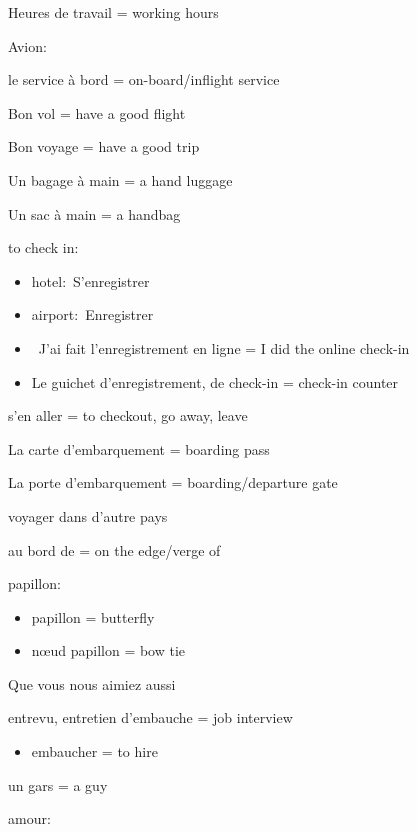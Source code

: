 Heures de travail = working hours~

Avion:

{le service à bord = on-board/inflight service}

Bon vol = have a good flight~

Bon voyage = have a good trip~

Un bagage à main = a hand luggage~

Un sac à main = a handbag~

to check in:

\begin{itemize}
\item
  hotel:~S'enregistrer
\item
  airport:~Enregistrer
\item
  ~J'ai fait l'enregistrement en ligne = I did the online check-in
\item
  Le guichet d'enregistrement, de check-in = check-in counter
\end{itemize}

s'en aller = to checkout, go away, leave

La carte d'embarquement = boarding pass

La porte d'embarquement = boarding/departure gate

voyager dans d'autre pays

au bord de = on the edge/verge of

papillon:

\begin{itemize}
\item
  papillon = butterfly
\item
  nœud papillon = bow tie
\end{itemize}

Que vous nous aimiez aussi~

entrevu, entretien d'embauche = job interview

\begin{itemize}
\item
  embaucher = to hire
\end{itemize}

un gars = a guy

amour:

